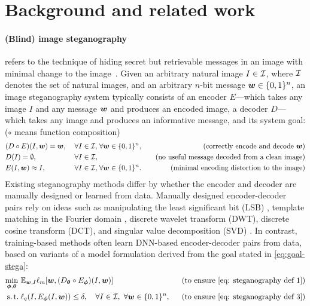 \section{Background and related work}
\label{Sec: background}

\paragraph{(Blind) image steganography} refers to the technique of hiding secret but retrievable messages in an image with minimal change to the image~\citep{zhu2018hidden}. Given an arbitrary natural image $I \in {\mathcal{I}}$, where ${\mathcal{I}}$ denotes the set of natural images, and an arbitrary $n$-bit message $\boldsymbol w \in \{0, 1\}^n$, an image steganography system typically consists of an encoder $E$---which takes any image $I$ and any message $\boldsymbol w$ and produces an encoded image, a decoder $D$---which takes any image and produces an informative message, and its system goal: ($\circ$ means function composition)  
\begin{subequations}
\label{eq:goal-stega}
\begin{align}
\label{eq: steganography def 1}
& (D \circ E) (I, \boldsymbol w) = \boldsymbol w, \; & \forall I \in {\mathcal{I}}, & \; \forall \boldsymbol w \in \{0, 1\}^n, & \quad \text{(correctly encode and decode $\boldsymbol w$)} \\
\label{eq: steganography def 2}
& D(I) = \emptyset, \; & \forall I \in {\mathcal{I}}, & & \quad \text{(no useful message decoded from a clean image)}\\
\label{eq: steganography def 3}
& E(I, \boldsymbol w) \approx I, \; & \forall I \in {\mathcal{I}},
 & \; \forall \boldsymbol w \in \{0, 1\}^n. & \quad \text{(minimal encoding distortion to the image)} 
\end{align}
\end{subequations}
Existing steganography methods differ by whether the encoder and decoder are manually designed or learned from data. Manually designed encoder-decoder pairs rely on ideas such as manipulating the least significant bit (LSB) \citep{tirkel1993electronic}, template matching in the Fourier domain \citep{pereira2000robust}, discrete wavelet transform (DWT), discrete cosine transform (DCT), and singular value decomposition (SVD) \citep{bi2007robust, pereira2000robust, navas2008dwt}. In contrast, training-based methods often learn DNN-based encoder-decoder pairs from data, based on variants of a model formulation derived from the goal stated in \cref{eq:goal-stega}: 
\begin{gather}
\begin{aligned}
\min_{\mb \phi, \mb \theta} ~ & \bb E_{\mb w, I} \ell_{m}[\mb w, (D_{\mb \theta} \circ E_{\mb \phi}) (I, \mb w)] & \text{(to ensure \cref{eq: steganography def 1})} \\
\st \; & \ell_{q} (I, E_{\mb \phi} (I, \mb w)) \leq \delta,  \quad \forall I \in \gI, ~ \forall \mb w \in \{0, 1\}^n, ~~ & \text{(to ensure \cref{eq: steganography def 3})}
\label{eq: learning-based steganography obj}
\end{aligned}   
\end{gather}
